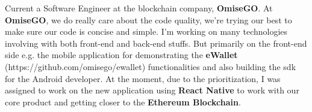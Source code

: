 

\begin{cvparagraph}

Current a Software Engineer at the blockchain company, \textbf{OmiseGO}. At \textbf{OmiseGO}, we do really care about the code quality, we're trying our best to make sure our code is concise and simple. I'm working on many technologies involving with both front-end and back-end stuffs. But primarily on the front-end side e.g. the mobile application for demonstrating the \textbf{eWallet} (https://github.com/omisego/ewallet) functionalities and also building the sdk for the Android developer. At the moment, due to the prioritization, I was assigned to work on the new application using \textbf{React Native} to work with our core product and getting closer to the \textbf{Ethereum Blockchain}. 

\end{cvparagraph}
